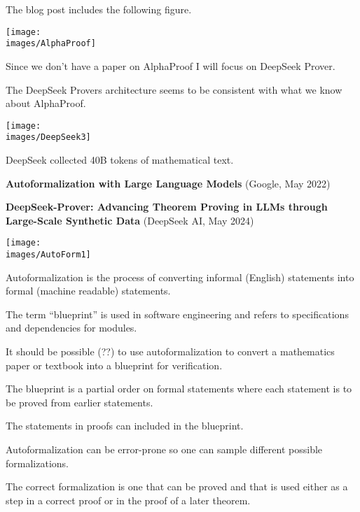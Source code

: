 {

The blog post includes the following figure.

\centerline{\texttt{[image: \\images/AlphaProof]}}


Since we don't have a paper on AlphaProof I will focus on DeepSeek Prover.

\vfill
The DeepSeek Provers architecture seems to be consistent with what we know about AlphaProof.

\vfill
\centerline{\texttt{[image: \\images/DeepSeek3]}}

\vfill
DeepSeek collected 40B tokens of mathematical text.


{\huge
{\bf Autoformalization with Large Language Models} (Google, May 2022)

\vfill
{\bf DeepSeek-Prover: Advancing Theorem Proving in
LLMs through Large-Scale Synthetic Data} (DeepSeek AI, May 2024)
}

\vfill
\centerline{\texttt{[image: \\images/AutoForm1]}}

\vfill
Autoformalization is the process of converting informal (English) statements into formal (machine readable) statements.


The term ``blueprint'' is used in
software engineering and refers to specifications and dependencies for modules.

\vfill
It should be possible (??) to use autoformalization to convert a mathematics paper or textbook into a blueprint
for verification.

\vfill
The blueprint is a partial order on formal statements where each statement is to be proved from earlier statements.

\vfill
The statements in proofs can included in the blueprint.


Autoformalization can be error-prone so one can sample different possible formalizations.

\vfill
The correct formalization is one that can be proved and that is used either as a step in a correct proof or in the proof of a later theorem.



}
